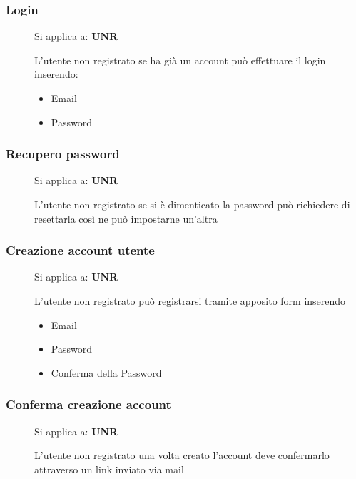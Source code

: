 \documentclass{article}
\begin{document}
\subsubsection{Login} \label{rf_8}
\begin{description}
    \item[] Si applica a: \textbf{UNR}
    \item[] L'utente non registrato se ha già un account può effettuare il login inserendo:
          \begin{itemize}
              \item Email
              \item Password
          \end{itemize}
\end{description}
\subsubsection{Recupero password} \label{rf_9}
\begin{description}
    \item[] Si applica a: \textbf{UNR}
    \item[] L'utente non registrato se si è dimenticato la password può richiedere di resettarla così ne può impostarne un'altra
\end{description}
\subsubsection{Creazione account utente} \label{rf_10}
\begin{description}
    \item[] Si applica a: \textbf{UNR}
    \item[] L'utente non registrato può registrarsi tramite apposito form inserendo
          \begin{itemize}
              \item Email
              \item Password
              \item Conferma della Password
          \end{itemize}
\end{description}
\subsubsection{Conferma creazione account} \label{}
\begin{description}
    \item[] Si applica a: \textbf{UNR}
    \item[] L'utente non registrato una volta creato l'account deve confermarlo attraverso un link inviato via mail
\end{description}
\end{document}

